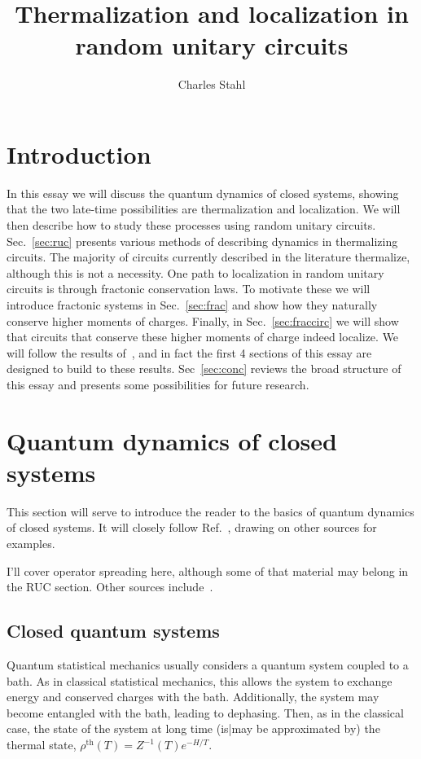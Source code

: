 \documentclass[a4paper,12pt]{article}
\title{Thermalization and localization in random unitary circuits}
\author{Charles Stahl}
\newcommand{\note}[1]{{\color{red}{#1}}}
\begin{document}
\maketitle

\section{Introduction} \label{sec:intro}

In this essay we will discuss the quantum dynamics of closed systems, showing that the two late-time possibilities are thermalization and localization. We will then describe how to study these processes using random unitary circuits. Sec.~\ref{sec:ruc} presents various methods of describing dynamics in thermalizing circuits. The majority of circuits currently described in the literature thermalize, although this is not a necessity. One path to localization in random unitary circuits is through fractonic conservation laws. To motivate these we will introduce fractonic systems in Sec.~\ref{sec:frac} and show how they naturally conserve higher moments of charges. Finally, in Sec.~\ref{sec:fraccirc} we will show that circuits that conserve these higher moments of charge indeed localize. We will follow the results of~\cite{PaiFracton}, and in fact the first 4 sections of this essay are designed to build to these results. Sec~\ref{sec:conc} reviews the broad structure of this essay and presents some possibilities for future research.

\note{Include term ``scrambling, ergodic"}


\section{Quantum dynamics of closed systems} \label{sec:dyn}

This section will serve to introduce the reader to the basics of quantum dynamics of closed systems. It will closely follow Ref.~\cite{Nandkishore14}, drawing on other sources for examples.

I'll cover operator spreading here, although some of that material may belong in the RUC section. Other sources include~\cite{GogolinStatMech, PolkovnikovClosed, Cazalilla2010}.

\subsection{Closed quantum systems} \label{sub:closed}

Quantum statistical mechanics usually considers a quantum system coupled to a bath. As in classical statistical mechanics, this allows the system to exchange energy and conserved charges with the bath. Additionally, the system may become entangled with the bath, leading to dephasing. Then, as in the classical case, the state of the system at long time (is|may be approximated by) the thermal state, $\rho^{\text{th}}(T)=Z^{-1}(T)e^{-H/T}$. 
\end{document}
